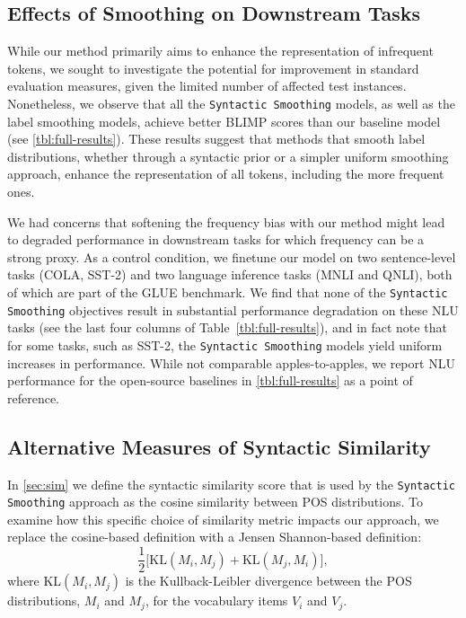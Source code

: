 \subsection{Effects of Smoothing on Downstream Tasks}
While our method primarily aims to enhance the representation of infrequent tokens, we sought to investigate the potential for improvement in standard evaluation measures, given the limited number of affected test instances. Nonetheless, we observe that all the \texttt{Syntactic Smoothing} models, as well as the label smoothing models, achieve better BLIMP scores than our baseline model (see \cref{tbl:full-results}). These results suggest that methods that smooth label distributions, whether through a syntactic prior or a simpler uniform smoothing approach, enhance the representation of all tokens, including the more frequent ones.

We had concerns that softening the frequency bias with our method might lead to degraded performance in downstream tasks for which frequency can be a strong proxy. As a control condition, we finetune our model on two sentence-level tasks (COLA, SST-2) and two language inference tasks (MNLI and QNLI), both of which are part of the GLUE \citep{wang2018glue} benchmark. We find that none of the \texttt{Syntactic Smoothing} objectives result in substantial performance degradation on these NLU tasks (see the last four columns of Table~\cref{tbl:full-results}), and in fact note that for some tasks, such as SST-2, the \texttt{Syntactic Smoothing} models yield uniform increases in performance. While not comparable apples-to-apples, we report NLU performance for the open-source baselines in \cref{tbl:full-results} as a point of reference. 

\subsection{Alternative Measures of Syntactic Similarity}

In \cref{sec:sim} we define the syntactic similarity score that is used by the \texttt{Syntactic Smoothing} approach as the cosine similarity between POS distributions. To examine how this specific choice of similarity metric impacts our approach, we replace the cosine-based definition with a Jensen Shannon-based definition:
$$ \frac{1}{2}\big[ \text{KL}(M_i, M_j ) + \text{KL}(M_j, M_i)\big],$$
where KL$(M_i, M_j)$ is the Kullback-Leibler divergence between the POS distributions, $M_i$ and $M_j$, for the vocabulary items $V_i$ and $V_j$.

